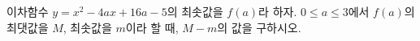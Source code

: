 이차함수 $y=x^2-4ax+16a-5$의 최솟값을 $f(a)$라 하자. $0\le a\le 3$에서 $f(a)$의 최댓값을 $M$, 최솟값을 $m$이라 할 때, $M-m$의 값을 구하시오.
